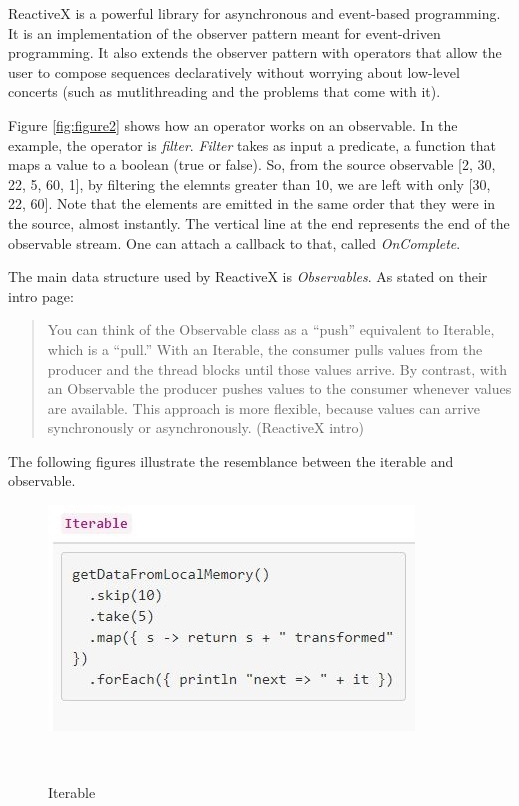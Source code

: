 \documentclass{sigchi}
\begin{document}
ReactiveX is a powerful library for asynchronous and event-based programming. It is an implementation of the observer pattern meant for event-driven programming. It also extends the observer pattern with operators that allow the user to compose sequences declaratively without worrying about low-level concerts (such as mutlithreading and the problems that come with it).


Figure \ref{fig:figure2} shows how an operator works on an observable. In the example, the operator is \textit{filter}. \textit{Filter} takes as input a predicate, a function that maps a value to a boolean (true or false). So, from the source observable [2, 30, 22, 5, 60, 1], by filtering the elemnts greater than 10, we are left with only [30, 22, 60]. Note that the elements are emitted in the same order that they were in the source, almost instantly. The vertical line at the end represents the end of the observable stream. One can attach a callback to that, called \textit{OnComplete}.


The main data structure used by ReactiveX is \textit{Observables}. As stated on their intro page:

\begin{quote}
  You can think of the Observable class as a “push” equivalent to Iterable, which is a “pull.” With an Iterable, the consumer pulls values from the producer and the thread blocks until those values arrive. By contrast, with an Observable the producer pushes values to the consumer whenever values are available. This approach is more flexible, because values can arrive synchronously or asynchronously. (ReactiveX intro)
\end{quote}


The following figures illustrate the resemblance between the iterable and observable.

\begin{figure}[h]
  \centering
  \includegraphics[width=0.9\columnwidth]{figures/RX_iterable}
  \caption{Iterable}~\label{fig:figure3}
\end{figure}
\end{document}
